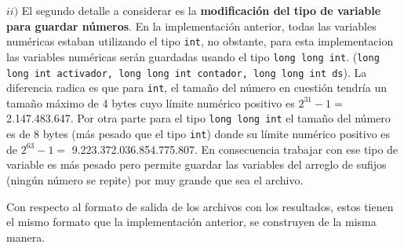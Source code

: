 $ii)$ El segundo detalle a considerar es la \textbf{modificación del tipo de variable para guardar números}. En la implementación anterior, todas las variables numéricas estaban utilizando el tipo \texttt{int}, no obstante, para esta implementacion las variables numéricas serán guardadas usando el tipo \texttt{long long int}. (\texttt{long long int activador, long long int contador, long long int ds}). La diferencia radica es que para \texttt{int}, el tamaño del número en cuestión tendría un tamaño máximo de 4 bytes cuyo límite numérico positivo es $2^{31}-1 =$ 2.147.483.647. Por otra parte para el tipo \texttt{long long int} el tamaño del número es de 8 bytes (más pesado que el tipo \texttt{int}) donde su límite numérico positivo es de $2^{63}-1 =$ 9.223.372.036.854.775.807. En consecuencia trabajar con ese tipo de variable es más pesado pero permite guardar las variables del arreglo de sufijos (ningún número se repite) por muy grande que sea el archivo.

Con respecto al formato de salida de los archivos con los resultados, estos tienen el mismo formato que la implementación anterior, se construyen de la misma manera.

